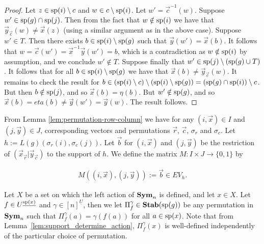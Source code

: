 \documentclass[../paper.tex]{subfiles}
\begin{document}
\begin{proof}
	Let $z \in \text{sp}(i) \setminus c$ and $w \in c \setminus \text{sp}(i)$. Let $w' =
	\vec{c}^{-1}(w)$. Suppose $w' \in \text{sp}(g) \cap \text{sp}(j)$. Then from the
	fact that $w \notin \text{sp}(i)$ we have that $\vec{y}_{\vec{c}}(w) \neq
	\vec{x}(z)$ (using a similar argument as in the above case). Suppose $w' \in
	T$. Then there exists $b \in \text{sp}(i) \setminus \text{sp}(g)$ such that
	$\vec{y}(w') = \vec{x}(b)$. It follows that $w = \vec{c}(w') =
	\vec{x}^{-1}\vec{y} (w') = b$, which is a contradiction as $w \notin
	\text{sp}(i)$ by assumption, and we conclude $w' \notin T$. Suppose finally that
	$w' \in \text{sp}(j) \setminus (\text{sp}(g) \cup T)$. It follows that for all $b
	\in \text{sp}(i) \setminus \text{sp}(g)$ we have that $\vec{x}(b) \neq
	\vec{y}_{\vec{c}}(w)$. It remains to check the result for $b \in (\text{sp}(i)
	\setminus c) \setminus (\text{sp}(i) \setminus \text{sp}(g)) = (\text{sp}(g) \cap
	\text{sp}(i)) \setminus c$. But then $b \notin \text{sp}(j)$, and so $\vec{x}(b) =
	\eta (b)$. But $w' \notin \text{sp}(g)$, and so $\vec{x}(b) = eta(b) \neq
	\vec{y}(w') = \vec{y}(w)$. The result follows.
\end{proof}

From Lemma \ref{lem:permutation-row-column} we have for any $(i, \vec{x}) \in I$
and $(j, \vec{y}) \in J$, corresponding vectors and permutations $\vec{r}$,
$\vec{c}$, $\sigma_r$ and $\sigma_c$. Let $h := L(g)(\sigma_r(i), \sigma_c
(j))$. Let $\vec{b}$ for $(i, \vec{x})$ and $(j, \vec{y})$ be the restriction of
$(\vec{x}_{\vec{r}} \vert \vec{y}_{\vec{c}})$ to the support of $h$. We define
the matrix $M : I \times J \rightarrow \{0,1\}$ by

\begin{align*}
	M((i , \vec{x}), (j, \vec{y})) := \vec{b} \in EV_h. 
\end{align*}



Let $X$ be a set on which the left action of $\text{\textbf{Sym}}_n$ is defined, and let $x \in
X$. Let $f \in U^{\underline{\text{sp}(x)}}$ and $\gamma\in [n]^{\underline{U}}$,
then we let $\Pi^{\gamma}_{f} \in \text{\textbf{Stab}} (\text{sp} (g))$ be any permutation in $\text{\textbf{Sym}}_n$
such that $\Pi^{\gamma}_f (a) = \gamma (f(a))$ for all $a \in \text{sp}(x)$. Note
that from Lemma~\ref{lem:support_determine_action}, $\Pi^{\gamma}_f(x)$ is
well-defined independently of the particular choice of permutation.
\end{document}
